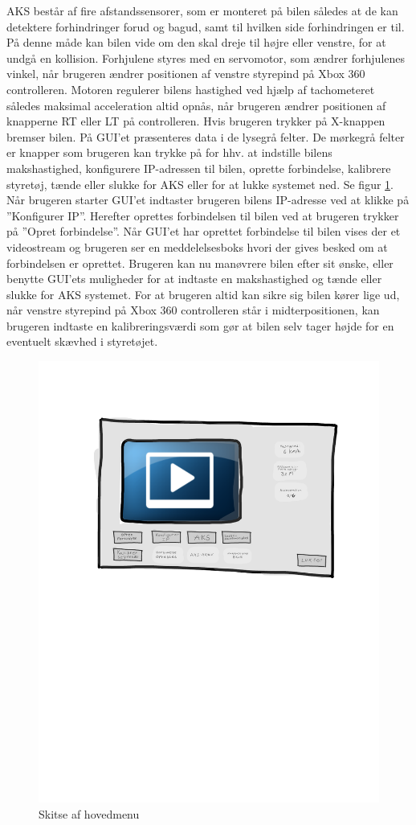 \clearpage

AKS består af fire afstandssensorer, som er monteret på bilen således at de kan detektere forhindringer forud og bagud, samt til hvilken side forhindringen er til. På denne måde kan bilen vide om den skal dreje til højre eller venstre, for at undgå en kollision. Forhjulene styres med en servomotor, som ændrer forhjulenes vinkel, når brugeren ændrer positionen af venstre styrepind på Xbox 360 controlleren. Motoren regulerer bilens hastighed ved hjælp af tachometeret således maksimal acceleration altid opnås, når brugeren ændrer positionen af knapperne RT eller LT på controlleren. Hvis brugeren trykker på X-knappen bremser bilen. På GUI'et præsenteres data i de lysegrå felter. De mørkegrå felter er knapper som brugeren kan trykke på for hhv. at indstille bilens makshastighed, konfigurere IP-adressen til bilen, oprette forbindelse, kalibrere styretøj, tænde eller slukke for AKS eller for at lukke systemet ned. Se figur \ref{fig:main_menu}. Når brugeren starter GUI'et indtaster brugeren bilens IP-adresse ved at klikke på ''Konfigurer IP''. Herefter oprettes forbindelsen til bilen ved at brugeren trykker på ''Opret forbindelse''. Når GUI'et har oprettet forbindelse til bilen vises der et videostream og brugeren ser en meddelelsesboks hvori der gives besked om at forbindelsen er oprettet. Brugeren kan nu manøvrere bilen efter sit ønske, eller benytte GUI'ets muligheder for at indtaste en makshastighed og tænde eller slukke for AKS systemet. For at brugeren altid kan sikre sig bilen kører lige ud, når venstre styrepind på Xbox 360 controlleren står i midterpositionen, kan brugeren indtaste en kalibreringsværdi som gør at bilen selv tager højde for en eventuelt skævhed i styretøjet.

\begin{figure}[h]
\centering
\includegraphics[width=\textwidth*4/5]{../fig/gui/hovedmenu}
\caption{Skitse af hovedmenu}
\label{fig:main_menu}
\end{figure}